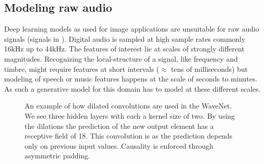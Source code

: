 \subsection{Modeling raw audio}
Deep learning models as used for image applications are unsuitable for raw audio signals (signals in ). Digital audio is sampled at high sample rates commonly 16kHz up to 44kHz. The features of interest lie at scales of strongly different magnitudes. Recognizing the local-structure of a signal, like frequency and timbre, might require features at short intervals (\(\approx\) tens of milliseconds) but modeling of speech or music features happens at the scale of seconds to minutes. As such a generative model for this domain has to model at these different scales.

\begin{figure}[]
    
    \caption{An example of how dilated convolutions are used in the WaveNet. We see three hidden layers with each a kernel size of two. By using the dilations the prediction of the new output element has a receptive field of 18. This convolution is  as the prediction depends only on previous input values. Causality is enforced through asymmetric padding.}
    \label{fig:wavenet}
\end{figure}

